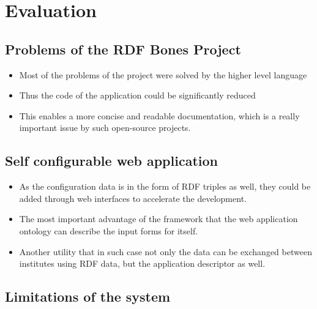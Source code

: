 \chapter{Evaluation}

\section{Problems of the RDF Bones Project}

\begin{itemize}
	\item Most of the problems of the project were solved by the higher level language 
	\item Thus the code of the application could be significantly reduced
	\item This enables a more concise and readable documentation, which is a really important issue by such open-source projects.
\end{itemize}


\section{Self configurable web application}

\begin{itemize}
	\item As the configuration data is in the form of RDF triples as well, they could be added through web interfaces to accelerate the development.
	\item The most important advantage of the framework that the web application ontology can describe the input forms for itself. 
	\item Another utility that in such case not only the data can be exchanged between institutes using RDF data, but the application descriptor as well.
\end{itemize}

\section{Limitations of the system}

